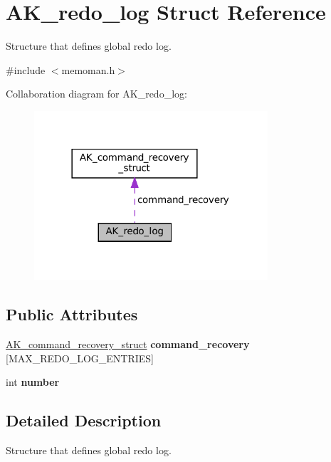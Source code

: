 \hypertarget{structAK__redo__log}{}\section{A\+K\+\_\+redo\+\_\+log Struct Reference}
\label{structAK__redo__log}


Structure that defines global redo log.  




{\ttfamily \#include $<$memoman.\+h$>$}



Collaboration diagram for A\+K\+\_\+redo\+\_\+log\+:\nopagebreak
\begin{figure}[H]
\begin{center}
\leavevmode
\includegraphics[width=246pt]{structAK__redo__log__coll__graph}
\end{center}
\end{figure}
\subsection*{Public Attributes}
\begin{DoxyCompactItemize}
\item 
\mbox{\label{structAK__redo__log_a467a5ff468a681b337c7f10923d6751e}} 
\hyperlink{structAK__command__recovery__struct}{A\+K\+\_\+command\+\_\+recovery\+\_\+struct} {\bfseries command\+\_\+recovery} \mbox{[}M\+A\+X\+\_\+\+R\+E\+D\+O\+\_\+\+L\+O\+G\+\_\+\+E\+N\+T\+R\+I\+ES\mbox{]}
\item 
\mbox{\label{structAK__redo__log_acbe6ec888664705a9a2e13c5a70e0c8a}} 
int {\bfseries number}
\end{DoxyCompactItemize}


\subsection{Detailed Description}
Structure that defines global redo log. 


